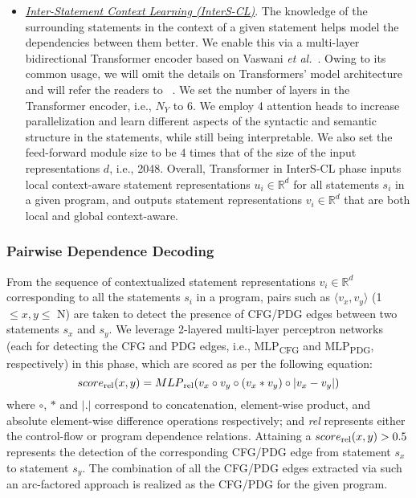 \begin{itemize}[leftmargin=*, listparindent=\parindent, parsep=0pt, itemsep=\topsep]
    \item \underline{\textit{Inter-Statement Context Learning (InterS-CL)}}. The knowledge of the surrounding statements in the context of a given statement helps \tool model the dependencies between them better. We enable this via a multi-layer bidirectional Transformer encoder based on Vaswani {\em et al.}~\cite{Vaswani-2017}. Owing to its common usage, we will omit the details on Transformers' model architecture and will refer the readers to ~\cite{Vaswani-2017}. We set the number of layers in the Transformer encoder, i.e., $N_Y$ to 6. 
    We employ 4 attention heads
    to increase parallelization 
    and learn different aspects of the syntactic and semantic structure in the statements, while still being interpretable. We also set the feed-forward module size to be 4 times that of the size of the input representations $d$, i.e., 2048. Overall, Transformer in InterS-CL phase inputs local context-aware statement representations $u_i \in \mathbb{R}^d$ for all statements $s_i$ in a given program, and outputs statement representations $v_i \in \mathbb{R}^d$ that are both local and global context-aware.
\end{itemize}

\subsubsection{Pairwise Dependence Decoding}
From the sequence of contextualized statement representations $v_i \in\mathbb{R}^d$ corresponding to all the statements $s_i$ in a program, pairs such as $\langle v_x, v_y \rangle$ (1$\leq x, y\leq$ N) are taken to detect the presence of CFG/PDG edges between two statements $s_x$ and $s_y$. We leverage 2-layered multi-layer perceptron networks (each for detecting the CFG and PDG edges, i.e., MLP\textsubscript{CFG} and MLP\textsubscript{PDG}, respectively) in this phase, which are scored as per the following equation:
\begin{equation}
\centering
    score\textsubscript{rel}(x, y) = MLP\textsubscript{rel}(v_x \circ v_y \circ (v_x * v_y) \circ |v_x - v_y|) \nonumber
\end{equation}
where $\circ$, $*$ and $|.|$ correspond to concatenation, element-wise
product, and absolute element-wise difference operations respectively;
and \textit{rel} represents either the control-flow or program
dependence relations. 
Attaining a $score\textsubscript{rel}(x, y) >
0.5$ represents the detection of the corresponding CFG/PDG edge from
statement $s_x$ to statement $s_y$. The combination of all the CFG/PDG
edges extracted via such an arc-factored approach is realized as the
CFG/PDG for the given program.

